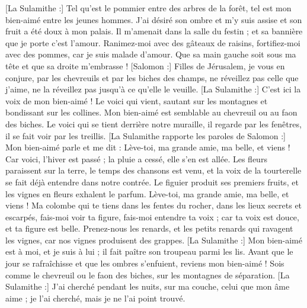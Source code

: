 \begin{multicols}{2}
[La Sulamithe :] Tel qu'est le pommier entre des arbres de la forêt, tel est mon bien-aimé entre les jeunes hommes. J'ai désiré son ombre et m'y suis assise et son fruit a été doux à mon palais.
Il m'amenait dans la salle du festin ; et sa bannière que je porte c'est l'amour.
 Ranimez-moi avec des gâteaux de raisins, fortifiez-moi avec des pommes, car je suis malade d’amour.
Que sa main gauche soit sous ma tête et que sa droite m'embrasse !
[Salomon :] Filles de Jérusalem, je vous en conjure, par les chevreuils et par les biches des champs, ne réveillez pas celle que j'aime, ne la réveillez pas jusqu'à ce qu'elle le veuille.
[La Sulamithe :] C'est ici la voix de mon bien-aimé ! Le voici qui vient, sautant sur les montagnes et bondissant sur les collines.
Mon bien-aimé est semblable au chevreuil ou au faon des biches. Le voici qui se tient derrière notre muraille, il regarde par les fenêtres, il se fait voir par les treillis.
[La Sulamithe rapporte les paroles de Salomon :] Mon bien-aimé parle et me dit : Lève-toi, ma grande amie, ma belle, et viens !
Car voici, l'hiver est passé ; la pluie a cessé, elle s'en est allée.
Les fleurs paraissent sur la terre, le temps des chansons est venu, et la voix de la tourterelle se fait déjà entendre dans notre contrée.
Le figuier produit ses premiers fruits, et les vignes en fleurs exhalent le parfum. Lève-toi, ma grande amie, ma belle, et viens !
Ma colombe qui te tiens dans les fentes du rocher, dans les lieux secrets et escarpés, fais-moi voir ta figure, fais-moi entendre ta voix ; car ta voix est douce, et ta figure est belle.
Prenez-nous les renards, et les petits renards qui ravagent les vignes, car nos vignes produisent des grappes.
[La Sulamithe :] Mon bien-aimé est à moi, et je suis à lui ; il fait paître son troupeau parmi les lis.
Avant que le jour se rafraîchisse et que les ombres s'enfuient, reviens mon bien-aimé ! Sois comme le chevreuil ou le faon des biches, sur les montagnes de séparation.
\VerseOne{}[La Sulamithe :] J'ai cherché pendant les nuits, sur ma couche, celui que mon âme aime ; je l'ai cherché, mais je ne l'ai point trouvé.

\end{multicols}
